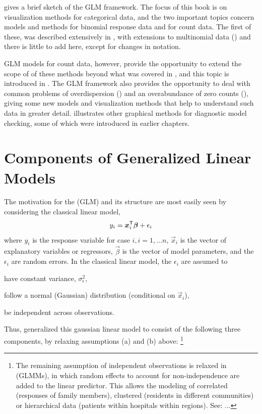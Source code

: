 \documentclass[11pt]{book}\usepackage[]{graphicx}\usepackage[]{color}
\begin{document}
 gives a brief sketch of the GLM framework.
The focus of this book is on visualization methods for categorical
data, and the two important topics concern models and methods for binomial response data
and for count data.  The first of these, 
was described extensively in
, 
with extensions to multinomial
data ()
and there is little to add here, except for changes
in notation.

GLM models for count data, however, provide the opportunity to extend 
the scope of of these methods beyond what was covered in ,
and this topic is introduced in .
The GLM framework also provides the opportunity to deal with common problems
of overdispersion () and an overabundance of
zero counts (), giving some new models and
visualization methods that help to understand such data in greater detail.
 illustrates other graphical methods for diagnostic
model checking, some of which were introduced in earlier chapters.



\section{Components of Generalized Linear Models}\label{glm:components}

The motivation for the  (GLM) and its structure are most
easily seen by considering the classical linear model,
\begin{equation*}
y_i = \bm{x}_i^\mathsf{T} \bm{\beta} + \epsilon_i
\end{equation*}
where 
$y_i$ is the response variable for case $i, i=1, \dots n$,
$\vec{x}_i$ is the vector of explanatory variables or regressors, 
$\vec{\beta}$ is the vector of model parameters, and the
$\epsilon_i$ are random errors.
In the classical linear model, the $\epsilon_i$ are assumed to
\begin{seriate}
  \item have constant variance, $\sigma^2_\epsilon$,
  \item follow a normal (Gaussian) distribution (conditional on $\vec{x}_i$),
  \item be independent across observations.
\end{seriate}

Thus, \citet{NelderWedderburn:72} generalized this gaussian linear model to
consist of the following three components, by relaxing assumptions (a) and (b) above:%
\footnote{The remaining assumption of independent observations is relaxed in
 (GLMMs), in which random effects to account for non-independence
are added to the linear predictor.
This allows the modeling of correlated (responses of family members), clustered (residents in 
different communities)
or hierarchical data
(patients within hospitals within regions). See: \citet{McCullochNeuhaus:2005} ...
}
\end{document}
